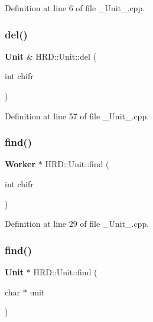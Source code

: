 Definition at line 6 of file \+\_\+\+Unit\+\_\+.\+cpp.

\mbox{\label{class_h_r_d_1_1_unit_a459dcefa63b6fe7086892e9831cc25fc}} 
\subsubsection{del()}
{\footnotesize\ttfamily \textbf{ Unit} \& H\+R\+D\+::\+Unit\+::del (\begin{DoxyParamCaption}\item[{int}]{chifr }\end{DoxyParamCaption})}



Definition at line 57 of file \+\_\+\+Unit\+\_\+.\+cpp.

\mbox{\label{class_h_r_d_1_1_unit_a7b60052481b820bcd16ec927ecc78060}} 
\subsubsection{find()\hspace{0.1cm}{\footnotesize\ttfamily [1/2]}}
{\footnotesize\ttfamily \textbf{ Worker} $\ast$ H\+R\+D\+::\+Unit\+::find (\begin{DoxyParamCaption}\item[{int}]{chifr }\end{DoxyParamCaption})}



Definition at line 29 of file \+\_\+\+Unit\+\_\+.\+cpp.

\mbox{\label{class_h_r_d_1_1_unit_a6a1408ecce3ee070d8bdeb537d8ee71a}} 
\subsubsection{find()\hspace{0.1cm}{\footnotesize\ttfamily [2/2]}}
{\footnotesize\ttfamily \textbf{ Unit} $\ast$ H\+R\+D\+::\+Unit\+::find (\begin{DoxyParamCaption}\item[{char $\ast$}]{unit }\end{DoxyParamCaption})}



